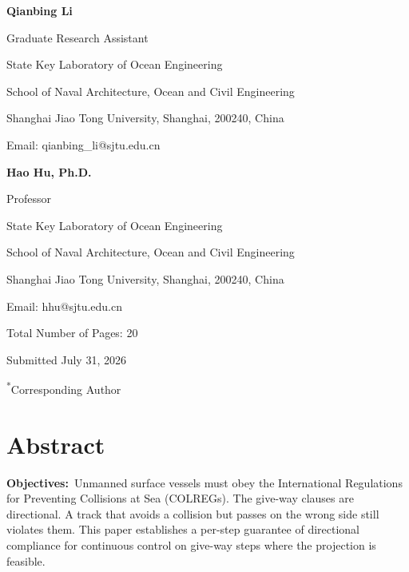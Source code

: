 \documentclass[10pt,letterpaper]{article}
\newcommand{\abshead}[1]{\textbf{#1}\ }
\begin{document}
\begin{flushleft}
{\bfseries Qianbing Li}\par
Graduate Research Assistant\par
State Key Laboratory of Ocean Engineering\par
School of Naval Architecture, Ocean and Civil Engineering\par
Shanghai Jiao Tong University, Shanghai, 200240, China\par
Email: qianbing\_li@sjtu.edu.cn\par
\vspace{12pt}

{\bfseries Hao Hu, Ph.D.}\par
Professor\par
State Key Laboratory of Ocean Engineering\par
School of Naval Architecture, Ocean and Civil Engineering\par
Shanghai Jiao Tong University, Shanghai, 200240, China\par
Email: hhu@sjtu.edu.cn\par
\vspace{12pt}

Total Number of Pages: 20\par
\vspace{24pt}

Submitted July 31, 2026\par
\textsuperscript{*}Corresponding Author\par
\end{flushleft}

\newpage

\section*{Abstract}
\begingroup
\setlength{\parindent}{0pt}

\abshead{Objectives:}Unmanned surface vessels must obey the International Regulations for Preventing Collisions at Sea (COLREGs). The give-way clauses are directional. A track that avoids a collision but passes on the wrong side still violates them. This paper establishes a per-step guarantee of directional compliance for continuous
control on give-way steps where the projection is feasible.
\end{document}
